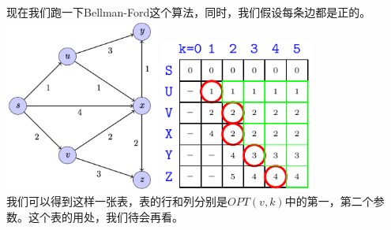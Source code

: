 	 现在我们跑一下Bellman-Ford这个算法，同时，我们假设每条边都是正的。\\
	 \includegraphics[width=2in]{L7-shortestpathexample.png}
	 \includegraphics[width=2in]{L7-Dijkstraexample.png}\\
	 我们可以得到这样一张表，表的行和列分别是$OPT(v,k)$中的第一，第二个参数。这个表的用处，我们待会再看。
	 
